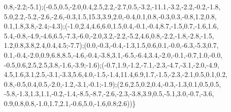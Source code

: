 {0.8,-2.2;-5.1);(-0.5,0.5,-2.0,0.4,2.5,2.2,-2.7,0.5,-3.2,-11.1,-3.2,-2.2,-0.2,-1.8,\\
5.0,2.2,-5.2,-2.6,-2.6,-0.3,1.5,15.3,3.9,2.0,-0.4,0.1,0.8,-0.3,0.3,-0.8,1.2,0.8,\\
0.1,1.8,3.8,-2.4;-4.3);(-1.0,2.4,4.6,6.0,1.5,0.4,-0.1,-0.4,8.7,-1.5,0.7,-1.6,1.6,\\
5.4,-0.8,-4.9,-4.6,6.5,-7.3,-6.0,-2.0,3.2,-2.2,-5.2,4.6,0.8,-2.2,-1.8,-2.8,-1.5,\\
1.2,0.8,3.8,2.4,0.4,4.5;-7.7);(0.0,-0.3,-0.4,-1.3,1.5,0.6,0.1,-0.0,-6.3,-5.3,0.7,\\
0.1,-0.4,-2.0,0.9,6.8,8.5,-4.6,-0.4,-3.8,3.1,-6.5,-6.4,3.4,-2.0,-0.1,-0.7,1.0,-0.0,\\
-0.5,0.6,2.5,2.5,3.8,-1.6,-3.9;-1.6);(-0.7,1.9,-1.2,-7.1,-2.3,-4.7,-3.1,-2.0,-4.9,\\
4.5,1.6,3.1,2.5,-3.1,-3.3,5.6,4.0,-1.5,-1.4,11.4,6.9,1.7,-1.5,-2.3,-2.1,0.5,0.1,0.2,\\
0.8,-0.5,0.4,0.5,-2.0,-1.2,-3.1,-0.1;-1.9);(2.6,2.5,0.2,0.4,-0.3,-1.3,0.1,0.5,0.5,\\
-5.8,-1.3,1.3,1.1,-0.2,-1.4,-8.5,-8.7,-2.6,-2.3,-3.8,3.9,0.5,-5.1,3.0,-0.7,-3.6,\\
0.9,0.8,0.8,-1.0,1.7,2.1,-0.6,5.0,-1.6,0.8;2.6))\}\\
}

\texttt{}
\normalsize
